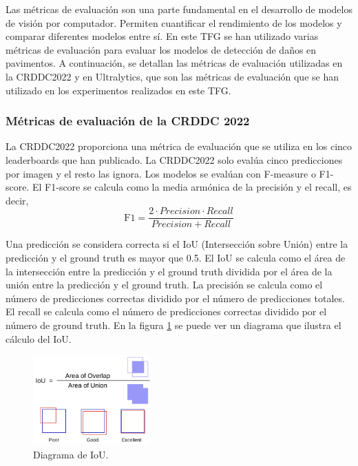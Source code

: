 
Las métricas de evaluación son una parte fundamental en el desarrollo de modelos de visión por computador. Permiten cuantificar el rendimiento de los modelos y comparar diferentes modelos entre sí. En este TFG se han utilizado varias métricas de evaluación para evaluar los modelos de detección de daños en pavimentos. A continuación, se detallan las métricas de evaluación utilizadas en la CRDDC2022 y en Ultralytics, que son las métricas de evaluación que se han utilizado en los experimentos realizados en este TFG.

\subsubsection{Métricas de evaluación de la CRDDC 2022}
La CRDDC2022 proporciona una métrica de evaluación que se utiliza en los cinco leaderboards que han publicado. La CRDDC2022 solo evalúa cinco predicciones por imagen y el resto las ignora. Los modelos se evalúan con F-measure o F1-score. El F1-score se calcula como la media armónica de la precisión y el recall, es decir,
\begin{equation}
    \text{F1} = \frac{2 \cdot Precision \cdot Recall}{Precision + Recall}
\end{equation}

Una predicción se considera correcta si el IoU (Intersección sobre Unión) entre la predicción y el ground truth es mayor que 0.5. El IoU se calcula como el área de la intersección entre la predicción y el ground truth dividida por el área de la unión entre la predicción y el ground truth. La precisión se calcula como el número de predicciones correctas dividido por el número de predicciones totales. El recall se calcula como el número de predicciones correctas dividido por el número de ground truth. En la figura \ref{fig:IoU} se puede ver un diagrama que ilustra el cálculo del IoU.

\begin{figure}[H]
    \centering
    \includegraphics[width=0.4\textwidth]{img/IoU-diagram.png}
    \caption{Diagrama de IoU. \cite{IoU_image}}
    \label{fig:IoU}
\end{figure}

